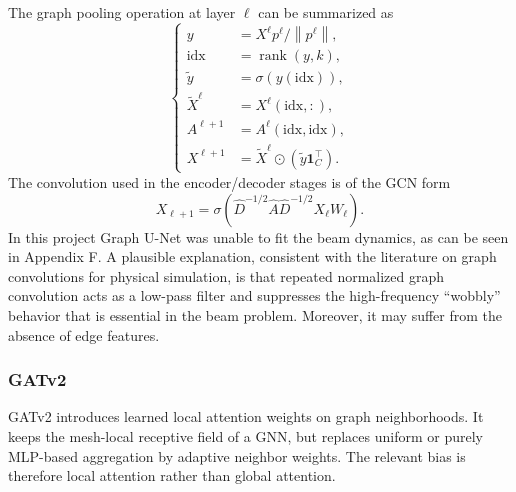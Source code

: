 \documentclass[11pt,a4paper,reqno]{amsart}
\theoremstyle{definition}
\theoremstyle{remark}
\numberwithin{equation}{section}
\newcommand{\norm}[1]{\left\lVert #1 \right\rVert}
\newcommand{\rank}{\operatorname{rank}}
\begin{document}
The graph pooling operation at layer $\ell$ can be summarized as
\begin{equation}
\left\{
\begin{aligned}
    y &= X^\ell p^\ell/\norm{p^\ell},\\
    \mathrm{idx} &= \rank(y,k),\\
    \tilde y &= \sigma(y(\mathrm{idx})),\\
    \tilde X^\ell &= X^\ell(\mathrm{idx},:),\\
    A^{\ell+1} &= A^\ell(\mathrm{idx},\mathrm{idx}),\\
    X^{\ell+1} &= \tilde X^\ell \odot (\tilde y\mathbf 1_C^\top).
\end{aligned}
\right.
\label{eq:graphunet-pool}
\end{equation}
The convolution used in the encoder/decoder stages is of the GCN form
\begin{equation}
    X_{\ell+1}=\sigma\left(\hat D^{-1/2}\hat A\hat D^{-1/2}X_\ell W_\ell\right).
    \label{eq:gcn}
\end{equation}
In this project Graph U-Net was unable to fit the beam dynamics, as can be seen in Appendix F. A plausible explanation, consistent with the literature on graph convolutions for physical simulation, is that repeated normalized graph convolution acts as a low-pass filter and suppresses the high-frequency ``wobbly'' behavior that is essential in the beam problem. Moreover, it may suffer from the absence of edge features.

\subsubsection{GATv2}

GATv2 introduces learned local attention weights on graph neighborhoods. It keeps the mesh-local receptive field of a GNN, but replaces uniform or purely MLP-based aggregation by adaptive neighbor weights. The relevant bias is therefore local attention rather than global attention.
\end{document}
